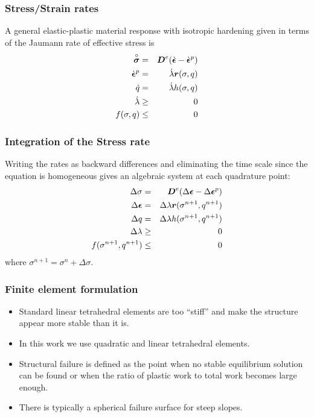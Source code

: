 \documentclass{beamer}
\newcommand{\Jrate}[1]{\stackrel{\circ}{#1}}
\begin{document}
\begin{frame}
  \frametitle{Stress/Strain rates} A general elastic-plastic material
  response with isotropic hardening given in terms of the Jaumann rate
  of effective stress is
\begin{eqnarray}
\Jrate{\ten{ \sigma}}  &=& \ten D^e (\dot{\ten \epsilon} - \dot{\ten \epsilon}^p) \\
\dot{\ten \epsilon}^p &=& \dot{\lambda} \ten r(\sigma,q) \\
\dot{q} &=& \dot{\lambda} h(\sigma,q) \\
\dot{\lambda} &\geq& 0 \\
f(\sigma,q) &\leq& 0
\end{eqnarray}
\end{frame}

\begin{frame}
  \frametitle{Integration of the Stress rate} Writing the rates as
  backward differences and eliminating the time scale since the
  equation is homogeneous gives an algebraic system at each quadrature
  point:
  \begin{eqnarray}
    \Delta \sigma  &=& \mbox{{\boldmath ${D}$}}^e (\Delta \mbox{{\boldmath ${\epsilon}$}} - \Delta \mbox{{\boldmath ${\epsilon}$}}^p) \\
    \Delta \mbox{{\boldmath ${\epsilon}$}} &=& \Delta \lambda \mbox{{\boldmath ${r}$}}(\sigma^{n+1},q^{n+1}) \\
    \Delta q &=& \Delta \lambda h(\sigma^{n+1},q^{n+1}) \\
    \Delta \lambda &\geq& 0 \\
    f(\sigma^{n+1},q^{n+1}) &\leq& 0 
  \end{eqnarray}
where $\sigma^{n+1} = \sigma^n + \Delta \sigma$.
\end{frame}

\begin{frame}
\frametitle{Finite element formulation}
\begin{itemize}
\item Standard linear tetrahedral elements are too ``stiff'' and
  make the structure appear more stable than it is.
\item In this work we use quadratic and linear tetrahedral elements.
\item Structural failure is defined as the point when no stable
  equilibrium solution can be found or when the ratio of plastic
  work to total work becomes large enough.
\item There is typically a spherical failure surface for steep
  slopes.
\end{itemize}
\end{frame}
\end{document}
